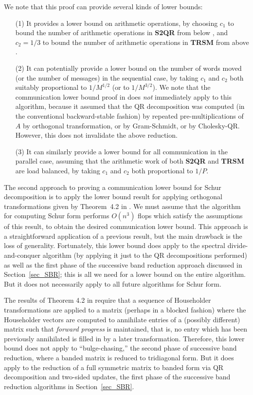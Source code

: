 \documentclass{article}
\theoremstyle{definition}
\begin{document}
We note that this proof can provide several kinds of lower bounds: \begin{itemize} \item[(1)] It provides a lower bound on arithmetic operations, by choosing $c_1$ to bound the number of arithmetic operations in \textbf{S2QR} from below \cite{DGHL08}, %
and $c_2 = 1/3$ to bound the number of arithmetic operations in \textbf{TRSM} from above \cite{BDHS10}.  %
\item[(2)] It can potentially provide a lower bound on the number of words moved (or the number of messages) in the sequential case, by taking $c_1$ and $c_2$ 
both suitably proportional to $1/M^{1/2}$ (or to $1/M^{3/2}$). 
We note that the communication lower bound proof in \cite{BDHS10}  %
does {\em not} immediately apply to this algorithm, 
because it assumed that the QR decomposition was computed 
(in the conventional backward-stable fashion) by repeated pre-multiplications 
of $A$ by orthogonal transformation, or by Gram-Schmidt, or by Cholesky-QR.
However, this does not invalidate the above reduction.
\item[(3)] It can similarly provide a lower bound for all communication in the parallel case, 
assuming that the arithmetic work of both \textbf{S2QR} and \textbf{TRSM} 
are load balanced, by taking $c_1$ and $c_2$ both proportional to $1/P$. 
\end{itemize}


The second approach to proving a communication lower bound for Schur decomposition 
is to apply the lower bound result for applying orthogonal transformations given by
Theorem~4.2 in \cite{BDHS10}.  We must assume that the algorithm for computing 
Schur form performs $O(n^3)$ flops which satisfy the assumptions of this result, 
to obtain the desired communication lower bound.  This approach is a 
straightforward application of a previous result, but the main drawback is the 
loss of generality.  Fortunately, this lower bound does apply to the 
spectral divide-and-conquer algorithm (by applying it just to the QR decompositions
performed) as well as the first phase of the successive band reduction approach 
discussed in Section~\ref{sec_SBR};
this is all we need for a lower bound on the entire algorithm.
But it does not necessarily apply to all future algorithms for Schur form.

The results of Theorem 4.2 in \cite{BDHS10} require that a sequence of 
Householder transformations are applied to a matrix (perhaps in a blocked fashion) 
where the Householder vectors are computed to annihilate entries of a 
(possibly different) matrix such that \emph{forward progress} is maintained,
that is, no entry which has been previously annihilated is filled in by a 
later transformation.  Therefore, this lower bound does not apply to 
``bulge-chasing,'' the second phase of successive band reduction,
where a banded matrix is reduced to tridiagonal form.
But it does apply to the reduction of a 
full symmetric matrix to banded form via QR decomposition and two-sided 
updates, the first phase of the
successive band reduction algorithms in Section~\ref{sec_SBR}.
\end{document}
